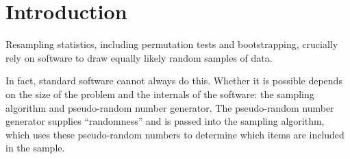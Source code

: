 \documentclass[graybox]{svmult}
\newcommand{\todo}[1]{{\color{red}{TO DO: \sc #1}}}
\begin{document}
\section{Introduction}
\label{sec:introduction}

%
%
%



Resampling statistics, including permutation tests and bootstrapping, crucially rely on software to draw equally likely random samples of data.
\todo{fill out sampling background}


In fact, standard software cannot always do this.
Whether it is possible depends on the size of the problem and the internals of the software:
the sampling algorithm and pseudo-random number generator.
The pseudo-random number generator supplies ``randomness'' and is passed into the sampling algorithm,
which uses these pseudo-random numbers to determine which items are included in the sample.
\end{document}
